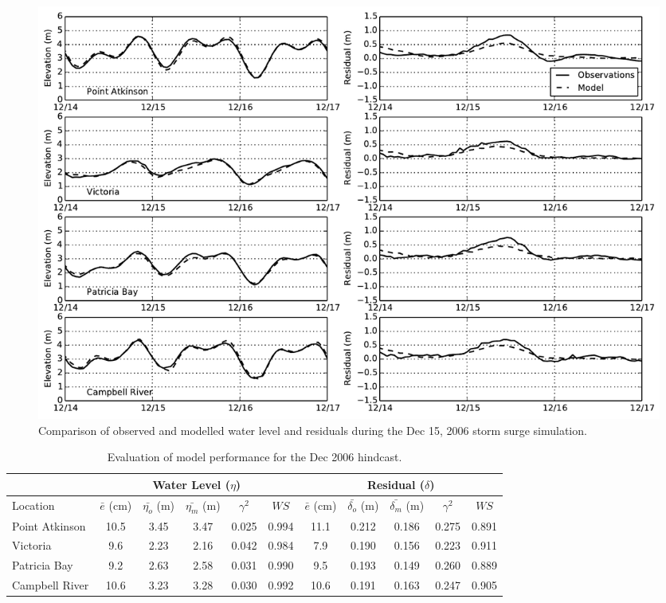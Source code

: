 \documentclass[pdftex,10pt]{article}
\begin{document}
\begin{figure}
\centering
\includegraphics[scale=0.6]{Figures/dec2006.pdf}
\caption{Comparison of observed and modelled water level and residuals during the Dec 15, 2006 storm surge simulation. }
\label{fig:dec2006}
\end{figure}%

\begin{table}[h]
\centering 
\begin{tabular}{|l |c c c c c | c c c c c|} 
\hline 
& \multicolumn{5}{|c|}{Water Level ($\eta$)}        & \multicolumn{5}{|c|}{Residual ($\delta$)} \\ 
\hline 
Location       & $\bar{e}$ (cm) & $\bar{\eta_{o}}$ (m) & $\bar{\eta_{m}}$ (m) & $\gamma^2$ & $WS$   & $\bar{e}$ (cm) & $\bar{\delta_{o}}$ (m) & $\bar{\delta_{m}}$ (m) & $\gamma^2$ & $WS$ \\
\hline 
Point Atkinson & 10.5           &  3.45                & 3.47                 &   0.025    & 0.994  & 11.1           &  0.212                 & 0.186                  &  0.275     & 0.891 \\
Victoria       &  9.6           &  2.23                & 2.16                 &   0.042    & 0.984  &  7.9           &  0.190                 & 0.156                  &  0.223     & 0.911 \\
Patricia Bay   &  9.2           &  2.63                & 2.58                 &   0.031    & 0.990  &  9.5           &  0.193                 & 0.149                  &  0.260     & 0.889 \\
Campbell River & 10.6           &  3.23                & 3.28                 &   0.030    & 0.992  & 10.6           &  0.191                 & 0.163                  &  0.247     & 0.905 \\
\hline 
\end{tabular}
\caption{Evaluation of model performance for the Dec 2006 hindcast.}
\label{tab:dec2006stat} 
\end{table}
\end{document}
